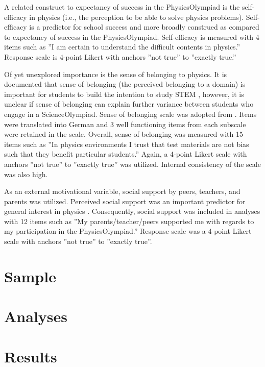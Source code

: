 \documentclass[]{interact}
\begin{document}
A related construct to expectancy of success in the PhysicsOlympiad is the self-efficacy in physics (i.e., the perception to be able to solve physics problems). Self-efficacy is a predictor for school success \citep[e.g.,][]{Britner.2006} and more broadly construed as compared to expectancy of success in the PhysicsOlympiad. Self-efficacy is measured with 4 items such as ''I am certain to understand the difficult contents in physics.'' Response scale is 4-point Likert with anchors ''not true'' to ''exactly true.'' 

Of yet unexplored importance is the sense of belonging to physics. It is documented that sense of belonging (the perceived belonging to a domain) is important for students to build the intention to study STEM \citep{Good.2012}, however, it is unclear if sense of belonging can explain further variance between students who engage in a ScienceOlympiad. Sense of belonging scale was adopted from \cite{Good.2012}. Items were translated into German and 3 well functioning items from each subscale were retained in the scale. Overall, sense of belonging was measured with 15 items such as ''In physics environments I trust that test materials are not bias such that they benefit particular students.'' Again, a 4-point Likert scale with anchors ''not true'' to ''exactly true'' was utilized. Internal consistency of the scale was also high.

As an external motivational variable, social support by peers, teachers, and parents was utilized. Perceived social support was an important predictor for general interest in physics \citep{Hoffmann.2002}. Consequently, social support was included in analyses with 12 items such as ''My parents/teacher/peers supported me with regards to my participation in the PhysicsOlympiad.'' Response scale was a 4-point Likert scale with anchors ''not true'' to ''exactly true''.





\section{Sample}



\section{Analyses}


\section{Results}
\end{document}

